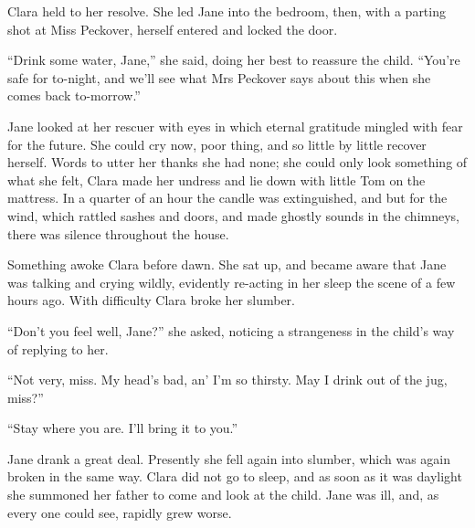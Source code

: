 Clara held to her resolve. She led Jane into the bedroom, then, with a
parting shot at Miss Peckover, herself entered and locked the door.

``Drink some water, Jane,'' she said, doing her best to reassure the
child. ``You're safe for to-night, and we'll see what Mrs Peckover says
about this when she comes back to-morrow.''

Jane looked at her rescuer with eyes in which eternal gratitude mingled
with fear for the future. She could cry now, poor thing, and so little
by little recover herself. Words to utter her thanks she had none; she
could only look something of what she felt, Clara made her undress and
lie down with little {\protect\hypertarget{91}{}{}}Tom on the mattress.
In a quarter of an hour the candle was extinguished, and but for the
wind, which rattled sashes and doors, and made ghostly sounds in the
chimneys, there was silence throughout the house.

Something awoke Clara before dawn. She sat up, and became aware that
Jane was talking and crying wildly, evidently re-acting in her sleep the
scene of a few hours ago. With difficulty Clara broke her slumber.

``Don't you feel well, Jane?'' she asked, noticing a strangeness in the
child's way of replying to her.

``Not very, miss. My head's bad, an' I'm so thirsty. May I drink out of
the jug, miss?''

``Stay where you are. I'll bring it to you.''

Jane drank a great deal. Presently she fell again into slumber, which
was again broken in the same way. Clara did not go to sleep, and as soon
as it was daylight she summoned her father to come and look at the
child. Jane was ill, and, as every one could see, rapidly grew worse.
